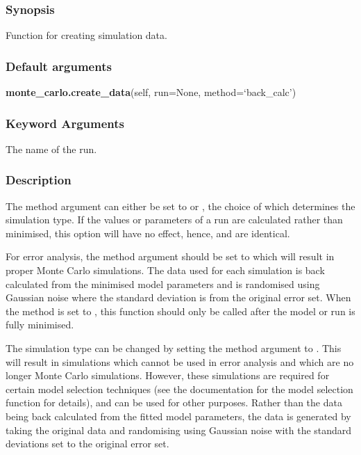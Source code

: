 \subsubsection{Synopsis}

Function for creating simulation data.

\subsubsection{Default arguments}

\textsf{\textbf{monte\_carlo.create\_data}(self, run=None, method=`back\_calc')}


\subsubsection{Keyword Arguments}

  The name of the run.


\subsubsection{Description}

The method argument can either be set to 
 or 
, the choice of which
determines the simulation type.  If the values or parameters of a run are calculated rather
than minimised, this option will have no effect, hence, 
 and 
 are
identical.

For error analysis, the method argument should be set to 
 which will result in
proper Monte Carlo simulations.  The data used for each simulation is back calculated from
the minimised model parameters and is randomised using Gaussian noise where the standard
deviation is from the original error set.  When the method is set to 
, this
function should only be called after the model or run is fully minimised.

The simulation type can be changed by setting the method argument to 
.  This will
result in simulations which cannot be used in error analysis and which are no longer Monte
Carlo simulations.  However, these simulations are required for certain model selection
techniques (see the documentation for the model selection function for details), and can be
used for other purposes.  Rather than the data being back calculated from the fitted model
parameters, the data is generated by taking the original data and randomising using Gaussian
noise with the standard deviations set to the original error set.



